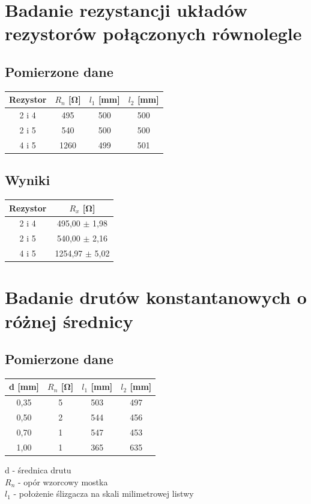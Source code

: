\documentclass{article}
\begin{document}
\section{Badanie rezystancji układów rezystorów połączonych równolegle}
\subsection{Pomierzone dane}
\begin{center}
\begin{tabular}{ c |  c | c | c}
Rezystor & $R_n$ [\si{\ohm}] & $l_1$ [mm] & $l_2$ [mm]\\
\hline
 2 i 4 & 495 & 500 & 500\\ 
 2 i 5 & 540 & 500 & 500\\ 
 4 i 5 & 1260 & 499 & 501\\ 
\end{tabular}
\end{center}


\subsection{Wyniki}
\begin{center}
\begin{tabular}{ c | c }
Rezystor & $R_x$ [\si{\ohm}]\\
\hline
2 i 4    & 495,00 $\pm$ 1,98\\ 
2 i 5  & 540,00 $\pm$ 2,16\\ 
4 i 5    & 1254,97 $\pm$ 5,02\\ 

\end{tabular}
\end{center}

\section{Badanie drutów konstantanowych o różnej średnicy}
\subsection{Pomierzone dane}

\begin{center}
\begin{tabular}{ c |  c | c | c}
d [mm] & $R_n$ [\si{\ohm}] & $l_1$ [mm] & $l_2$ [mm]\\
\hline
 0,35 & 5 & 503 & 497\\ 
 0,50 & 2 & 544 & 456\\ 
 0,70 & 1 & 547 & 453\\ 
 1,00 & 1 & 365 & 635\\ 

\end{tabular}
\end{center}
{d} - średnica drutu\\
$R_n$ - opór wzorcowy mostka\\ 
$l_1$ - położenie ślizgacza na skali milimetrowej listwy\\
\end{document}

